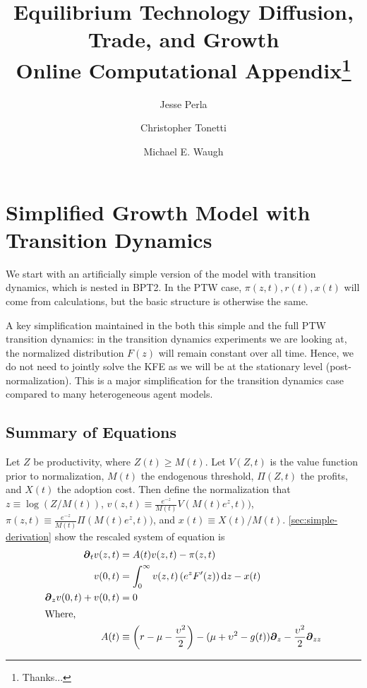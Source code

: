 \documentclass[11pt]{article}
\newcommand{\D}[1][]{\ensuremath{\boldsymbol{\partial}_{#1}}}
\newcommand{\diff}{\ensuremath{\mathrm{d}}}
\begin{document}
\title{Equilibrium Technology Diffusion, Trade, and Growth\\Online Computational Appendix\thanks{Thanks...}}
\author{Jesse Perla \and Christopher Tonetti \and Michael E. Waugh}
\maketitle

\section{Simplified Growth Model with Transition Dynamics}
We start with an artificially simple version of the model with transition dynamics, which is nested in BPT2.  In the PTW case, $\pi(z,t), r(t), x(t)$ will come from calculations, but the basic structure is otherwise the same.

A key simplification maintained in the both this simple and the full PTW transition dynamics: in the transition dynamics experiments we are looking at, the normalized distribution $F(z)$ will remain constant over all time.  Hence, we do not need to jointly solve the KFE as we will be at the stationary level (post-normalization).  This is a major simplification for the transition dynamics case compared to many heterogeneous agent models.  %

\subsection{Summary of Equations}
Let $Z$ be productivity, where $Z(t) \geq M(t)$.  Let $V(Z,t)$ is the value function prior to normalization, $M(t)$ the endogenous threshold, $\Pi(Z,t)$ the profits, and $X(t)$ the adoption cost.  Then define the normalization that $z \equiv \log(Z/M(t))$, $v(z,t) \equiv \frac{e^{-z}}{M(t)}V(M(t)e^z, t))$, $\pi(z,t) \equiv \frac{e^{-z}}{M(t)}\Pi(M(t)e^z, t))$, and $x(t) \equiv X(t)/M(t)$.  \cref{sec:simple-derivation} show the rescaled system of equation is
\begin{align}
\D[t]v(z,t) &= A(t)v(z,t) - \pi(z,t)\label{eq:simple-summary1}\\
v(0,t) &= \int_{0}^{\infty}  v(z,t) \left(e^z F'(z)\right) \diff z - x(t)\label{eq:simple-summary2}\\
\D[z]v(0,t) + v(0,t) &= 0\label{eq:simple-summary3}\\
\intertext{Where,}
A(t) &\equiv \left(r - \mu - \frac{\upsilon^2}{2}\right) - (\mu+ \upsilon^2 - g(t)) \D[z] - \frac{\upsilon^2}{2} \D[zz]\label{eq:simple-summary4}
\end{align} 
\end{document}
